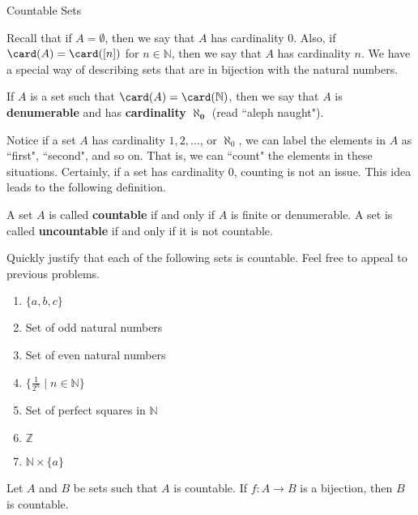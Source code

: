 \begin{section}{Countable Sets}

Recall that if $A=\emptyset$, then we say that $A$ has cardinality 0.  Also, if $\card(A)=\card([n])$ for $n\in\mathbb{N}$, then we say that $A$ has cardinality $n$.  We have a special way of describing sets that are in bijection with the natural numbers.

\begin{definition}
If $A$ is a set such that $\card(A)=\card(\mathbb{N})$, then we say that $A$ is \textbf{denumerable} and has \textbf{cardinality} $\mathbf{\aleph_0}$ (read ``aleph naught").
\end{definition}

Notice if a set $A$ has cardinality $1,2,\ldots$, or $\aleph_0$, we can label the elements in $A$ as ``first", ``second", and so on.  That is, we can ``count" the elements in these situations. Certainly, if a set has cardinality 0, counting is not an issue.  This idea leads to the following definition.

\begin{definition}\label{def:countable}
A set $A$ is called \textbf{countable} if and only if $A$ is finite or denumerable. A set is called \textbf{uncountable} if and only if it is not countable.
\end{definition}

\begin{problem}
Quickly justify that each of the following sets is countable. Feel free to appeal to previous problems.
\begin{enumerate}[label=\textrm{(\alph*)}]
\item $\{a,b,c\}$
\item Set of odd natural numbers
\item Set of even natural numbers
\item $\{\frac{1}{2^n}\mid n\in \mathbb{N}\}$
\item Set of perfect squares in $\mathbb{N}$
\item $\mathbb{Z}$
\item $\mathbb{N}\times \{a\}$
\end{enumerate}
\end{problem}

\begin{theorem}
Let $A$ and $B$ be sets such that $A$ is countable. If $f:A\to B$ is a bijection, then $B$ is countable.
\end{theorem}


\end{section}
